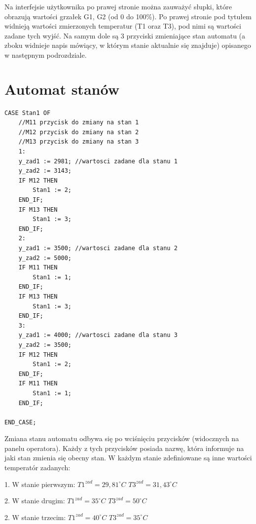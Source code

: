 Na interfejsie użytkownika po prawej stronie można zauważyć słupki, które obrazują wartości grzałek G1, G2 (od 0 do 100\%). Po prawej stronie pod tytułem widnieją wartości zmierzonych temperatur (T1 oraz T3), pod nimi są wartości zadane tych wyjść. Na samym dole są 3 przyciski zmieniające stan automatu (a zboku widnieje napis mówiący, w którym stanie aktualnie się znajduje) opisanego w następnym podrozdziale.

\section{Automat stanów}

\begin{lstlisting}[style=customc,frame=single, caption=Implementacja automatu stanów , label=lst:overheat_lock] 
CASE Stan1 OF
	//M11 przycisk do zmiany na stan 1
	//M12 przycisk do zmiany na stan 2
	//M13 przycisk do zmiany na stan 3
	1:
	y_zad1 := 2981; //wartosci zadane dla stanu 1
	y_zad2 := 3143;
	IF M12 THEN
		Stan1 := 2;
	END_IF;
	IF M13 THEN
		Stan1 := 3;
	END_IF;
	2:
	y_zad1 := 3500; //wartosci zadane dla stanu 2
	y_zad2 := 5000;
	IF M11 THEN
		Stan1 := 1;
	END_IF;
	IF M13 THEN
		Stan1 := 3;
	END_IF;
	3:
	y_zad1 := 4000; //wartosci zadane dla stanu 3
	y_zad2 := 3500;
	IF M12 THEN
		Stan1 := 2;
	END_IF;
	IF M11 THEN
		Stan1 := 1;
	END_IF;
	
END_CASE;
\end{lstlisting} 

Zmiana stanu automatu odbywa się po wciśnięciu przycisków (widocznych na panelu operatora). Każdy z tych przycisków posiada nazwę, która informuje na jaki stan zmienia się obecny stan.
W każdym stanie zdefiniowane są inne wartości temperatór zadanych:

1. W stanie pierwszym: $T1^{zad}=29,81^{\circ} C$  $T3^{zad}=31,43^{\circ} C$

2. W stanie drugim: $T1^{zad}=35^{\circ} C$  $T3^{zad}=50^{\circ} C$

2. W stanie trzecim: $T1^{zad}=40^{\circ} C$  $T3^{zad}=35^{\circ} C$


